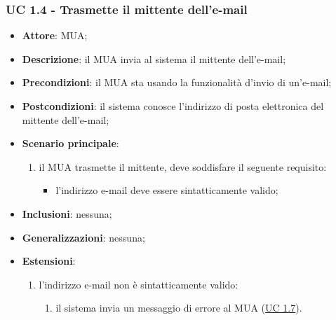     \subsubsection{UC 1.4 - Trasmette il mittente dell'e-mail} \label{sec:UC1.4}
    \begin{itemize}
        \item \textbf{Attore}: MUA;
        \item \textbf{Descrizione}: il MUA invia al sistema il mittente dell'e-mail;
        \item \textbf{Precondizioni}: il MUA sta usando la funzionalità d'invio di un'e-mail;
        \item \textbf{Postcondizioni}: il sistema conosce l'indirizzo di posta elettronica del mittente dell'e-mail;
        \item \textbf{Scenario principale}:
            \begin{enumerate}
                \item il MUA trasmette il mittente, deve soddisfare il seguente requisito:
                    \begin{itemize}
                        \item l'indirizzo e-mail deve essere sintatticamente valido;
                    \end{itemize}
            \end{enumerate}
        \item \textbf{Inclusioni}: nessuna;
        \item \textbf{Generalizzazioni}: nessuna;
        \item \textbf{Estensioni}:
            \begin{enumerate}[label=\alph*.]
                \item l'indirizzo e-mail non è sintatticamente valido:
                \begin{enumerate}[label=\arabic*.]
                    \item il sistema invia un messaggio di errore al MUA (\hyperref[sec:UC1.7]{UC 1.7}).
                \end{enumerate}
            \end{enumerate}
    \end{itemize}

